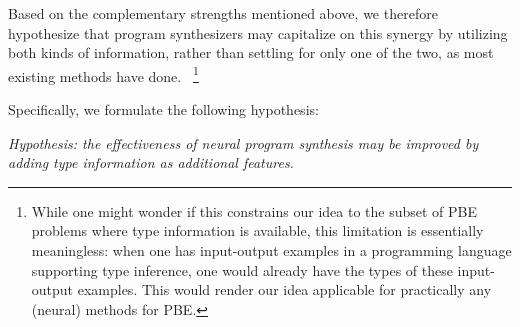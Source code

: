\documentclass{article} %
\begin{document}
Based on the complementary strengths mentioned above,
we therefore hypothesize that program synthesizers may capitalize on this synergy by utilizing both kinds of information,
rather than settling for only one of the two, as most existing methods have done.%
~\footnote{
    While one might wonder if this constrains our idea to the subset of PBE problems where type information is available,
    this limitation is essentially meaningless:
    when one has input-output examples in a programming language supporting type inference,
    one would already have the types of these input-output examples.
    This would render our idea applicable for practically any (neural) methods for PBE.
}%

Specifically, we formulate the following hypothesis:
\begin{displayquote} %
    \emph{
        Hypothesis:
        the effectiveness of neural program synthesis may be improved by
        adding type information as additional features.
    }
\end{displayquote}


\end{document}
